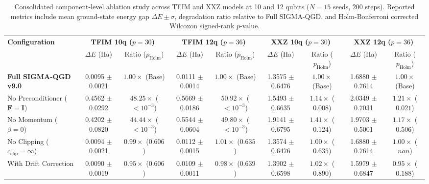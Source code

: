 \begin{table}[htbp]
\centering
\small
\caption{Consolidated component-level ablation study across TFIM and XXZ models at 10 and 12 qubits ($N=15$ seeds, $200$ steps). Reported metrics include mean ground-state energy gap $\Delta E \pm \sigma$, degradation ratio relative to Full SIGMA-QGD, and Holm-Bonferroni corrected Wilcoxon signed-rank $p$-value.}
\label{tab:ablation_consolidated}
\begin{tabular}{lcccccccc}
\toprule
\multirow{2}{*}{\textbf{Configuration}} & \multicolumn{2}{c}{\textbf{TFIM 10q ($p=30$)}} & \multicolumn{2}{c}{\textbf{TFIM 12q ($p=36$)}} & \multicolumn{2}{c}{\textbf{XXZ 10q ($p=30$)}} & \multicolumn{2}{c}{\textbf{XXZ 12q ($p=36$)}} \\
\cmidrule(lr){2-3} \cmidrule(lr){4-5} \cmidrule(lr){6-7} \cmidrule(lr){8-9}
& $\Delta E$ (Ha) & Ratio ($p_{\text{Holm}}$) & $\Delta E$ (Ha) & Ratio ($p_{\text{Holm}}$) & $\Delta E$ (Ha) & Ratio ($p_{\text{Holm}}$) & $\Delta E$ (Ha) & Ratio ($p_{\text{Holm}}$) \\
\midrule
\textbf{Full SIGMA-QGD v9.0} & 0.0095 $\pm$ 0.0021 & $1.00\times$ (Base) & 0.0111 $\pm$ 0.0014 & $1.00\times$ (Base) & 1.3575 $\pm$ 0.6476 & $1.00\times$ (Base) & 1.6880 $\pm$ 0.7614 & $1.00\times$ (Base) \\
No Preconditioner ($\mathbf{F}=\mathbf{I}$) & 0.4562 $\pm$ 0.0292 & $48.25\times$ ($< 10^{-3}$) & 0.5669 $\pm$ 0.0186 & $50.92\times$ ($< 10^{-3}$) & 1.5493 $\pm$ 0.6635 & $1.14\times$ ($0.008$) & 2.0349 $\pm$ 0.7031 & $1.21\times$ ($0.021$) \\
No Momentum ($\beta=0$) & 0.4202 $\pm$ 0.0820 & $44.44\times$ ($< 10^{-3}$) & 0.5544 $\pm$ 0.0604 & $49.80\times$ ($< 10^{-3}$) & 1.9141 $\pm$ 0.6795 & $1.41\times$ ($0.124$) & 1.9703 $\pm$ 0.5001 & $1.17\times$ ($0.506$) \\
No Clipping ($c_{\text{clip}}=\infty$) & 0.0094 $\pm$ 0.0021 & $0.99\times$ ($0.606$) & 0.0112 $\pm$ 0.0015 & $1.01\times$ ($0.635$) & 1.3574 $\pm$ 0.6476 & $1.00\times$ ($0.635$) & 1.6880 $\pm$ 0.7614 & $1.00\times$ ($nan$) \\
With Drift Correction & 0.0090 $\pm$ 0.0019 & $0.95\times$ ($0.606$) & 0.0109 $\pm$ 0.0011 & $0.98\times$ ($0.639$) & 1.3902 $\pm$ 0.6598 & $1.02\times$ ($0.890$) & 1.5979 $\pm$ 0.6847 & $0.95\times$ ($0.188$) \\
\bottomrule
\end{tabular}
\end{table}